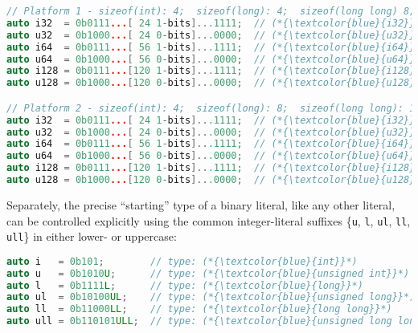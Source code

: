 \documentclass[twoside,10pt,letterpaper,usenames]{newstyle-PearsonGeneric-7-38}
\begin{document}
\begin{lstlisting}[language=C++]
// Platform 1 - sizeof(int): 4;  sizeof(long): 4;  sizeof(long long) 8;
auto i32  = 0b0111...[ 24 1-bits]...1111;  // (*{\textcolor{blue}{i32}}*)  is (*{\textcolor{blue}{int}}*)
auto u32  = 0b1000...[ 24 0-bits]...0000;  // (*{\textcolor{blue}{u32}}*)  is (*{\textcolor{blue}{unsigned int}}*)
auto i64  = 0b0111...[ 56 1-bits]...1111;  // (*{\textcolor{blue}{i64}}*)  is (*{\textcolor{blue}{long long}}*)
auto u64  = 0b1000...[ 56 0-bits]...0000;  // (*{\textcolor{blue}{u64}}*)  is (*{\textcolor{blue}{unsigned long long}}*)
auto i128 = 0b0111...[120 1-bits]...1111;  // (*{\textcolor{blue}{i128}}*) is ill-formed/DR
auto u128 = 0b1000...[120 0-bits]...0000;  // (*{\textcolor{blue}{u128}}*) is ill-formed/DR

// Platform 2 - sizeof(int): 4;  sizeof(long): 8;  sizeof(long long): 16;
auto i32  = 0b0111...[ 24 1-bits]...1111;  // (*{\textcolor{blue}{i32}}*)  is (*{\textcolor{blue}{int}}*)
auto u32  = 0b1000...[ 24 0-bits]...0000;  // (*{\textcolor{blue}{u32}}*)  is (*{\textcolor{blue}{unsigned int}}*)
auto i64  = 0b0111...[ 56 1-bits]...1111;  // (*{\textcolor{blue}{i64}}*)  is (*{\textcolor{blue}{long}}*)
auto u64  = 0b1000...[ 56 0-bits]...0000;  // (*{\textcolor{blue}{u64}}*)  is (*{\textcolor{blue}{unsigned long}}*)
auto i128 = 0b0111...[120 1-bits]...1111;  // (*{\textcolor{blue}{i128}}*) is (*{\textcolor{blue}{long long}}*)
auto u128 = 0b1000...[120 0-bits]...0000;  // (*{\textcolor{blue}{u128}}*) is (*{\textcolor{blue}{unsigned long long}}*)
\end{lstlisting}
    

Separately, the precise ``starting'' type of a binary literal, like any
other literal, can be controlled explicitly using the common
integer-literal suffixes \{\texttt{u}, \texttt{l}, \texttt{ul},
\texttt{ll}, \texttt{ull}\} in either lower- or uppercase:

\begin{lstlisting}[language=C++]
auto i   = 0b101;        // type: (*{\textcolor{blue}{int}}*)                  value: 5
auto u   = 0b1010U;      // type: (*{\textcolor{blue}{unsigned int}}*)         value: 10
auto l   = 0b1111L;      // type: (*{\textcolor{blue}{long}}*)                 value: 15
auto ul  = 0b10100UL;    // type: (*{\textcolor{blue}{unsigned long}}*)        value: 20
auto ll  = 0b11000LL;    // type: (*{\textcolor{blue}{long long}}*)            value: 25
auto ull = 0b110101ULL;  // type: (*{\textcolor{blue}{unsigned long long}}*)   value: 30
\end{lstlisting}
    
\end{document}
